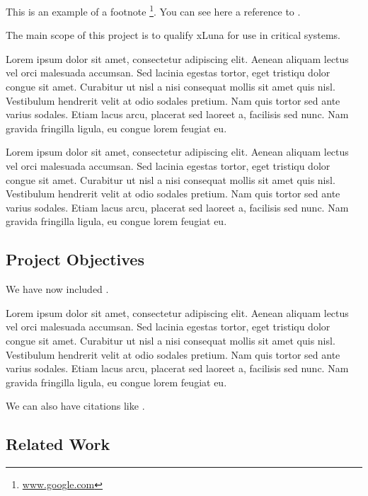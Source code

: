 This is an example of a footnote \footnote{\url{www.google.com}}. You can see here a reference to .


The main scope of this project is to qualify xLuna for use in critical systems.


Lorem ipsum dolor sit amet,\cite{grishman1996} consectetur adipiscing elit. Aenean aliquam lectus vel orci malesuada accumsan. Sed lacinia egestas tortor, eget tristiqu dolor congue sit amet. Curabitur ut nisl a nisi consequat mollis sit amet quis nisl. Vestibulum hendrerit velit at odio sodales pretium. Nam quis tortor sed ante varius sodales. Etiam lacus arcu, placerat sed laoreet a, facilisis sed nunc. Nam gravida fringilla ligula, eu congue lorem feugiat eu.

Lorem ipsum dolor sit amet, consectetur adipiscing elit. Aenean aliquam lectus vel orci malesuada accumsan. Sed lacinia egestas tortor, eget tristiqu dolor congue sit amet. Curabitur ut nisl a nisi consequat mollis sit amet quis nisl. Vestibulum hendrerit velit at odio sodales pretium. Nam quis tortor sed ante varius sodales. Etiam lacus arcu, placerat sed laoreet a, facilisis sed nunc. Nam gravida fringilla ligula, eu congue lorem feugiat eu.


\subsection{Project Objectives}
\label{sub-sec:proj-objectives}

We have now included .



Lorem ipsum dolor sit amet, consectetur adipiscing elit. Aenean aliquam lectus vel orci malesuada accumsan. Sed lacinia egestas tortor, eget tristiqu dolor congue sit amet. Curabitur ut nisl a nisi consequat mollis sit amet quis nisl. Vestibulum hendrerit velit at odio sodales pretium. Nam quis tortor sed ante varius sodales. Etiam lacus arcu, placerat sed laoreet a, facilisis sed nunc. Nam gravida fringilla ligula, eu congue lorem feugiat eu.

We can also have citations like \cite{iso-odf}.

\subsection{Related Work}

